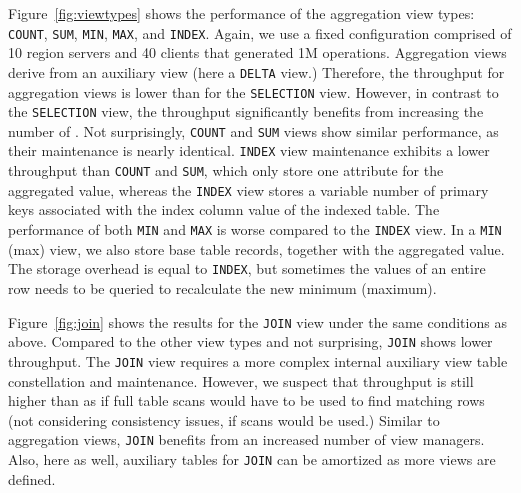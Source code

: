 Figure~\ref{fig:viewtypes} shows the performance of the aggregation
view types: \texttt{COUNT}, \texttt{SUM}, \texttt{MIN}, \texttt{MAX},
and \texttt{INDEX}. Again, we use a fixed configuration comprised of
10 region servers and 40 clients that generated 1M operations.
Aggregation views derive from an auxiliary view (here a \texttt{DELTA}
view.)  Therefore, the throughput for aggregation views is lower than
for the \texttt{SELECTION} view. However, in contrast to the
\texttt{SELECTION} view, the throughput significantly benefits from
increasing the number of \VMs. Not surprisingly, \texttt{COUNT} and
\texttt{SUM} views show similar performance, as their maintenance is
nearly identical.  \texttt{INDEX} view maintenance exhibits a lower
throughput than \texttt{COUNT} and \texttt{SUM}, which only store one
attribute for the aggregated value, whereas the \texttt{INDEX} view
stores a variable number of primary keys associated with the index
column value of the indexed table.  The performance of both
\texttt{MIN} and \texttt{MAX} is worse compared to the \texttt{INDEX}
view. In a \texttt{MIN} (max) view, we also store base table records,
together with the aggregated value.  The storage overhead is equal to
\texttt{INDEX}, but sometimes the values of an entire row needs to be
queried to recalculate the new minimum (maximum).  


Figure~\ref{fig:join} shows the results for the \texttt{JOIN} view
under the same conditions as above. Compared to the other view types
and not surprising, \texttt{JOIN} shows lower throughput.  The
\texttt{JOIN} view requires a more complex internal auxiliary view
table constellation and maintenance. However, we suspect that
throughput is still higher than as if full table scans would have to
be used to find matching rows (not considering consistency issues, if
scans would be used.)  Similar to aggregation views, \texttt{JOIN}
benefits from an increased number of view managers. Also, here as
well, auxiliary tables for \texttt{JOIN} can be amortized as more
views are defined.

